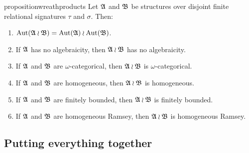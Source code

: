 \begin{restatable}{proposition}{wreathproducts} \label{prop:basic_properties_wreath_products}
Let $\mathfrak{A}$ and $\mathfrak{B}$ be structures over disjoint finite relational signatures $\tau$ and $\sigma$. Then:
    \begin{enumerate}
        \item \label{item:aut_wreath}  $\mathrm{Aut}(\mathfrak{A} \wr \mathfrak{B})=\mathrm{Aut}(\mathfrak{A}) \wr \mathrm{Aut}(\mathfrak{B})$.
        \item \label{item:algebraicity}  If $\mathfrak{A}$ has no algebraicity, then $\mathfrak{A}\wr\mathfrak{B}$ has no algebraicity.
        \item \label{item:aut_wreath_omega_cat}  If $\mathfrak{A}$ and $\mathfrak{B}$ are $\omega$-categorical, then $\mathfrak{A}\wr\mathfrak{B}$ is $\omega$-categorical. 
        \item \label{item:wreath_homogeneous} If $\mathfrak{A}$ and $\mathfrak{B}$ are homogeneous, then $\mathfrak{A}\wr\mathfrak{B}$ is homogeneous.
        \item \label{item:finite_boundedness} If $\mathfrak{A}$ and $\mathfrak{B}$ are finitely bounded, then $\mathfrak{A}\wr\mathfrak{B}$ is finitely bounded.
        \item \label{item:Ramsey} If $\mathfrak{A}$ and $\mathfrak{B}$ are homogeneous Ramsey, then $\mathfrak{A}\wr\mathfrak{B}$ is homogeneous Ramsey.
    \end{enumerate} 

 \end{restatable}  

\subsection{Putting everything together} \label{section:everything_together}

